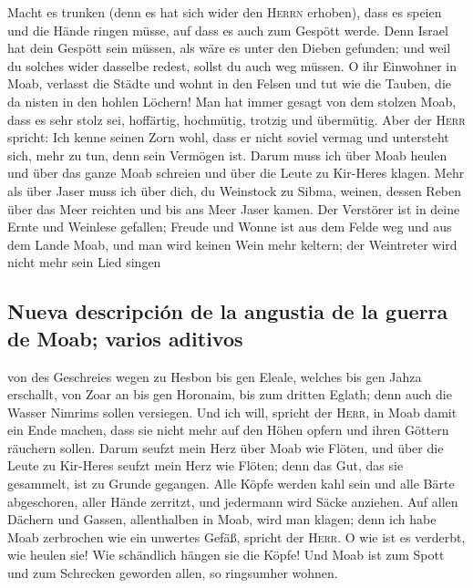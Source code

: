  Macht es trunken (denn es hat sich wider den
\textsc{Herrn} erhoben), dass es speien und die Hände ringen müsse, auf
dass es auch zum Gespött werde.  Denn Israel hat dein
Gespött sein müssen, als wäre es unter den Dieben gefunden; und weil du
solches wider dasselbe redest, sollst du auch weg müssen.
 O ihr Einwohner in Moab, verlasst die Städte und wohnt
in den Felsen und tut wie die Tauben, die da nisten in den hohlen
Löchern!  Man hat immer gesagt von dem stolzen Moab, dass
es sehr stolz sei, hoffärtig, hochmütig, trotzig und übermütig.
 Aber der \textsc{Herr} spricht: Ich kenne seinen Zorn
wohl, dass er nicht soviel vermag und untersteht sich, mehr zu tun, denn
sein Vermögen ist.  Darum muss ich über Moab heulen und
über das ganze Moab schreien und über die Leute zu Kir-Heres klagen.
 Mehr als über Jaser muss ich über dich, du Weinstock zu
Sibma, weinen, dessen Reben über das Meer reichten und bis ans Meer
Jaser kamen. Der Verstörer ist in deine Ernte und Weinlese gefallen;
 Freude und Wonne ist aus dem Felde weg und aus dem Lande
Moab, und man wird keinen Wein mehr keltern; der Weintreter wird nicht
mehr sein Lied singen

\hypertarget{nueva-descripciuxf3n-de-la-angustia-de-la-guerra-de-moab-varios-aditivos}{%
\subsection{Nueva descripción de la angustia de la guerra de Moab;
varios
aditivos}\label{nueva-descripciuxf3n-de-la-angustia-de-la-guerra-de-moab-varios-aditivos}}

 von des Geschreies wegen zu Hesbon bis gen Eleale,
welches bis gen Jahza erschallt, von Zoar an bis gen Horonaim, bis zum
dritten Eglath; denn auch die Wasser Nimrims sollen versiegen.
 Und ich will, spricht der \textsc{Herr}, in Moab damit
ein Ende machen, dass sie nicht mehr auf den Höhen opfern und ihren
Göttern räuchern sollen.  Darum seufzt mein Herz über
Moab wie Flöten, und über die Leute zu Kir-Heres seufzt mein Herz wie
Flöten; denn das Gut, das sie gesammelt, ist zu Grunde gegangen.
 Alle Köpfe werden kahl sein und alle Bärte abgeschoren,
aller Hände zerritzt, und jedermann wird Säcke anziehen. 
Auf allen Dächern und Gassen, allenthalben in Moab, wird man klagen;
denn ich habe Moab zerbrochen wie ein unwertes Gefäß, spricht der
\textsc{Herr}.  O wie ist es verderbt, wie heulen sie!
Wie schändlich hängen sie die Köpfe! Und Moab ist zum Spott und zum
Schrecken geworden allen, so ringsumher wohnen.

